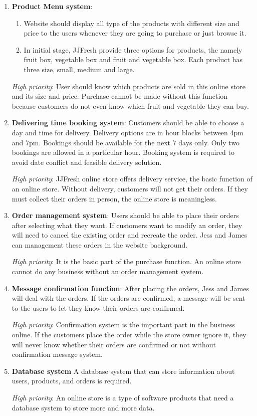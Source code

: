 \documentclass{report}
\begin{document}
\begin{enumerate}
  \item \textbf{Product Menu system}: 
  \begin{enumerate}
    \item Website should display all type of the products with different size and price to the users whenever they are going to purchase or just browse it. 
    \item In initial stage, JJFresh provide three options for products, the namely fruit box, vegetable box and fruit and vegetable box. Each product has three size, small, medium and large.
  \end{enumerate}

  \textit{High priority}: User should know which products are sold in this online store and its size and price. Purchase cannot be made without this function because customers do not even know which fruit and vegetable they can buy.
  
  \item \textbf{Delivering time booking system}: Customers should be able to choose a day and time for delivery. Delivery options are in hour blocks between 4pm and 7pm. Bookings should be available for the next 7 days only. Only two bookings are allowed in a particular hour. Booking system is required to avoid date conflict and feasible delivery solution.

  \textit{High priority}: JJFresh online store offers delivery service, the basic function of an online store. Without delivery, customers will not get their orders. If they must collect their orders in person, the online store is meaningless.

  \item \textbf{Order management system}: Users should be able to place their orders after selecting what they want. If customers want to modify an order, they will need to cancel the existing order and recreate the order. Jess and James can management these orders in the website background.

  \textit{High priority}: It is the basic part of the purchase function. An online store cannot do any business without an order management system.
  
  \item \textbf{Message confirmation function}: After placing the orders, Jess and James will deal with the orders. If the orders are confirmed, a message will be sent to the users to let they know their orders are confirmed.

  \textit{High priority}: Confirmation system is the important part in the business online. If the customers place the order while the store owner ignore it, they will never know whether their orders are confirmed or not without confirmation message system.

  \item \textbf{Database system} A database system that can store information about users, products, and orders is required.

  \textit{High priority}: An online store is a type of software products that need a database system to store more and more data.
\end{enumerate}
\end{document}
